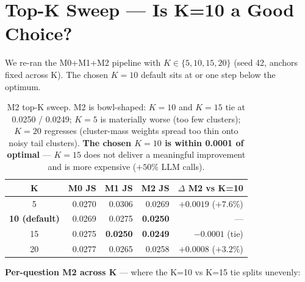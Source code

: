 \documentclass[10pt,a4paper]{article}
\newcommand{\good}[1]{\textcolor{green!50!black}{\textbf{#1}}}
\newcommand{\bad}[1]{\textcolor{red!60!black}{#1}}
\begin{document}
\section{Top-K Sweep — Is K=10 a Good Choice?}

We re-ran the M0+M1+M2 pipeline with $K \in \{5, 10, 15, 20\}$ (seed 42, anchors fixed across K). The chosen $K=10$ default sits at or one step below the optimum.

\begin{table}[H]
\centering
\small
\begin{tabular}{c r r r r}
\toprule
\textbf{K} & \textbf{M0} JS & \textbf{M1} JS & \textbf{M2} JS & \textbf{$\Delta$ M2 vs K=10} \\
\midrule
5  & 0.0270 & \bad{0.0306} & 0.0269 & $+0.0019$ ($+7.6\%$) \\
\rowcolor{m2row}
\textbf{10 (default)} & 0.0269 & 0.0275 & \good{0.0250} & --- \\
15 & 0.0275 & \good{0.0250} & \good{0.0249} & $-0.0001$ (tie) \\
20 & 0.0277 & 0.0265 & 0.0258 & $+0.0008$ ($+3.2\%$) \\
\bottomrule
\end{tabular}
\caption{M2 top-K sweep. M2 is bowl-shaped: $K=10$ and $K=15$ tie at 0.0250 / 0.0249; $K=5$ is materially worse (too few clusters); $K=20$ regresses (cluster-mass weights spread too thin onto noisy tail clusters). \textbf{The chosen $K=10$ is within 0.0001 of optimal} — $K=15$ does not deliver a meaningful improvement and is more expensive ($+50\%$ LLM calls).}
\end{table}

\textbf{Per-question M2 across K} — where the K=10 vs K=15 tie splits unevenly:
\end{document}
